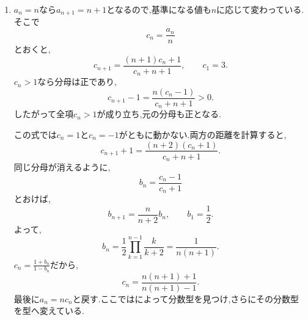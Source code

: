 \begin{enumerate}[label=\textbf{問\arabic*.},leftmargin=3.8em,format=\bookitemlink{practice-advanced}{solution}{problem}]
                \noindent \textbf{【別解】}\\
                $\displaystyle r_n=\frac{a_{n+1}}{a_n}$とおき,元の式を$a_na_{n+1}$で割ると,
                \[
                  r_{n+1}=2^{2n+1}r_n,\qquad r_1=8.
                \]
                これは型なので,
                \begin{align*}
                 r_n
                  &=2^{\,3+\sum_{k=1}^{n-1}(2k+1)}\\
                  &=2^{\,n^2+2}.
                \end{align*}
                もう一度比を掛け合わせて,
                \[
                 a_n
                  =2\prod_{k=1}^{n-1}2^{k^2+2}
                  =2^{\,1+\sum_{k=1}^{n-1}(k^2+2)}
                \]
                を得る.で差を取る方法と,元ので比を取る方法は,同じ構造を異なる形で使っている.
          \item $a_n=n$なら$a_{n+1}=n+1$となるので,基準になる値も$n$に応じて変わっている.そこで
                \[
                  c_n=\frac{a_n}{n}
                \]
                とおくと,
                \[
                  c_{n+1}
                   =\frac{(n+1)c_n+1}{c_n+n+1},
                  \qquad c_1=3.
                \]
                $c_n>1$なら分母は正であり,
                \[
                  c_{n+1}-1=\frac{n(c_n-1)}{c_n+n+1}>0.
                \]
                したがって全項$c_n>1$が成り立ち,元の分母も正となる.

                この式では$c_n=1$と$c_n=-1$がともに動かない.両方の距離を計算すると,
                \[
                  c_{n+1}+1
                   =\frac{(n+2)(c_n+1)}{c_n+n+1}.
                \]
                同じ分母が消えるように,
                \[
                  b_n=\frac{c_n-1}{c_n+1}
                \]
                とおけば,
                \[
                  b_{n+1}=\frac{n}{n+2}b_n,\qquad b_1=\frac12.
                \]
                よって,
                \[
                  b_n
                   =\frac12\prod_{k=1}^{n-1}\frac{k}{k+2}
                   =\frac{1}{n(n+1)}.
                \]
                $\displaystyle c_n=\frac{1+b_n}{1-b_n}$だから,
                \[
                  c_n=\frac{n(n+1)+1}{n(n+1)-1}.
                \]
                最後に$a_n=nc_n$と戻す.ここではによって分数型を見つけ,さらにその分数型を型へ変えている.


\end{enumerate}
